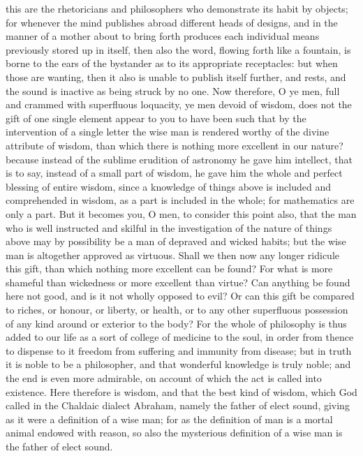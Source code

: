 this are the rhetoricians and philosophers who demonstrate its habit by objects; for whenever the
mind publishes abroad different heads of designs, and in the manner of a mother about to bring
forth produces each individual means previously stored up in itself, then also the word, flowing forth
like a fountain, is borne to the ears of the bystander as to its appropriate receptacles: but when
those are wanting, then it also is unable to publish itself further, and rests, and the sound is inactive
as being struck by no one. Now therefore, O ye men, full and crammed with superfluous loquacity,
ye men devoid of wisdom, does not the gift of one single element appear to you to have been such
that by the intervention of a single letter the wise man is rendered worthy of the divine attribute of
wisdom, than which there is nothing more excellent in our nature? because instead of the sublime
erudition of astronomy he gave him intellect, that is to say, instead of a small part of wisdom, he
gave him the whole and perfect blessing of entire wisdom, since a knowledge of things above is
included and comprehended in wisdom, as a part is included in the whole; for mathematics are only
a part. But it becomes you, O men, to consider this point also, that the man who is well instructed
and skilful in the investigation of the nature of things above may by possibility be a man of
depraved and wicked habits; but the wise man is altogether approved as virtuous. Shall we then
now any longer ridicule this gift, than which nothing more excellent can be found? For what is more
shameful than wickedness or more excellent than virtue? Can anything be found here not good,
and is it not wholly opposed to evil? Or can this gift be compared to riches, or honour, or liberty, or
health, or to any other superfluous possession of any kind around or exterior to the body? For the
whole of philosophy is thus added to our life as a sort of college of medicine to the soul, in order
from thence to dispense to it freedom from suffering and immunity from disease; but in truth it is
noble to be a philosopher, and that wonderful knowledge is truly noble; and the end is even more
admirable, on account of which the act is called into existence. Here therefore is wisdom, and that
the best kind of wisdom, which God called in the Chaldaic dialect Abraham, namely the father of
elect sound, giving as it were a definition of a wise man; for as the definition of man is a mortal
animal endowed with reason, so also the mysterious definition of a wise man is the father of elect
sound.

